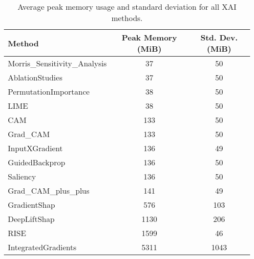 \begin{table}[ht]
\centering
\begin{tabular}{lcc}
\hline
Method & Peak Memory (MiB) & Std. Dev. (MiB) \\
\hline
Morris_Sensitivity_Analysis & 37 & 50 \\
AblationStudies & 37 & 50 \\
PermutationImportance & 38 & 50 \\
LIME & 38 & 50 \\
CAM & 133 & 50 \\
Grad_CAM & 133 & 50 \\
InputXGradient & 136 & 49 \\
GuidedBackprop & 136 & 50 \\
Saliency & 136 & 50 \\
Grad_CAM_plus_plus & 141 & 49 \\
GradientShap & 576 & 103 \\
DeepLiftShap & 1130 & 206 \\
RISE & 1599 & 46 \\
IntegratedGradients & 5311 & 1043 \\
\hline
\end{tabular}
\caption{Average peak memory usage and standard deviation for all XAI methods.}
\label{tab:memory_all}
\end{table}
